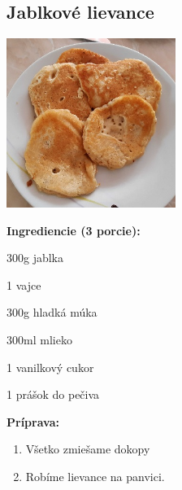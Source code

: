 \setcounter{step}{0}

\subsection{ Jablkové lievance }

\begin{ingredient}
  
      \includegraphics[height=5.5cm]{images/lievance}
  
  \def\portions{  }
  \textbf{ {\normalsize Ingrediencie (3 porcie):} }

  \begin{main}
      \item 300g jablka
      \item 1 vajce
      \item 300g hladká múka
      \item 300ml mlieko
      \item 1 vanilkový cukor
      \item 1 prášok do pečiva
  \end{main}
  
\end{ingredient}
\begin{recipe}
\textbf{ {\normalsize Príprava:} }
\begin{enumerate}

  \item{Všetko zmiešame dokopy}
  \item{Robíme lievance na panvici.}

\end{enumerate}
\end{recipe}

\begin{notes}
  
\end{notes}	
\clearpage
